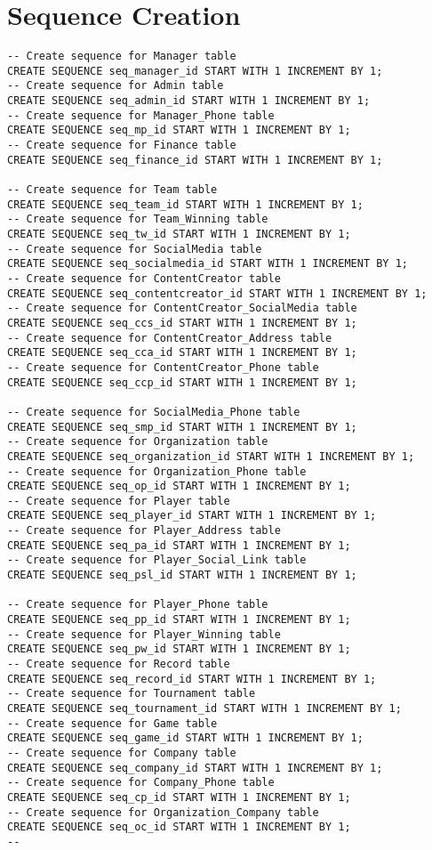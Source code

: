 \section{Sequence Creation}
\hrulefill
\begin{lstlisting}[caption={Sequence Creation},label={lst:sequence}]
-- Create sequence for Manager table
CREATE SEQUENCE seq_manager_id START WITH 1 INCREMENT BY 1;
-- Create sequence for Admin table
CREATE SEQUENCE seq_admin_id START WITH 1 INCREMENT BY 1;
-- Create sequence for Manager_Phone table
CREATE SEQUENCE seq_mp_id START WITH 1 INCREMENT BY 1;
-- Create sequence for Finance table
CREATE SEQUENCE seq_finance_id START WITH 1 INCREMENT BY 1;

-- Create sequence for Team table
CREATE SEQUENCE seq_team_id START WITH 1 INCREMENT BY 1;
-- Create sequence for Team_Winning table
CREATE SEQUENCE seq_tw_id START WITH 1 INCREMENT BY 1;
-- Create sequence for SocialMedia table
CREATE SEQUENCE seq_socialmedia_id START WITH 1 INCREMENT BY 1;
-- Create sequence for ContentCreator table
CREATE SEQUENCE seq_contentcreator_id START WITH 1 INCREMENT BY 1;
-- Create sequence for ContentCreator_SocialMedia table
CREATE SEQUENCE seq_ccs_id START WITH 1 INCREMENT BY 1;
-- Create sequence for ContentCreator_Address table
CREATE SEQUENCE seq_cca_id START WITH 1 INCREMENT BY 1;
-- Create sequence for ContentCreator_Phone table
CREATE SEQUENCE seq_ccp_id START WITH 1 INCREMENT BY 1;

-- Create sequence for SocialMedia_Phone table
CREATE SEQUENCE seq_smp_id START WITH 1 INCREMENT BY 1;
-- Create sequence for Organization table
CREATE SEQUENCE seq_organization_id START WITH 1 INCREMENT BY 1;
-- Create sequence for Organization_Phone table
CREATE SEQUENCE seq_op_id START WITH 1 INCREMENT BY 1;
-- Create sequence for Player table
CREATE SEQUENCE seq_player_id START WITH 1 INCREMENT BY 1;
-- Create sequence for Player_Address table
CREATE SEQUENCE seq_pa_id START WITH 1 INCREMENT BY 1;
-- Create sequence for Player_Social_Link table
CREATE SEQUENCE seq_psl_id START WITH 1 INCREMENT BY 1;

-- Create sequence for Player_Phone table
CREATE SEQUENCE seq_pp_id START WITH 1 INCREMENT BY 1;
-- Create sequence for Player_Winning table
CREATE SEQUENCE seq_pw_id START WITH 1 INCREMENT BY 1;
-- Create sequence for Record table
CREATE SEQUENCE seq_record_id START WITH 1 INCREMENT BY 1;
-- Create sequence for Tournament table
CREATE SEQUENCE seq_tournament_id START WITH 1 INCREMENT BY 1;
-- Create sequence for Game table
CREATE SEQUENCE seq_game_id START WITH 1 INCREMENT BY 1;
-- Create sequence for Company table
CREATE SEQUENCE seq_company_id START WITH 1 INCREMENT BY 1;
-- Create sequence for Company_Phone table
CREATE SEQUENCE seq_cp_id START WITH 1 INCREMENT BY 1;
-- Create sequence for Organization_Company table
CREATE SEQUENCE seq_oc_id START WITH 1 INCREMENT BY 1;
--
\end{lstlisting}
\clearpage